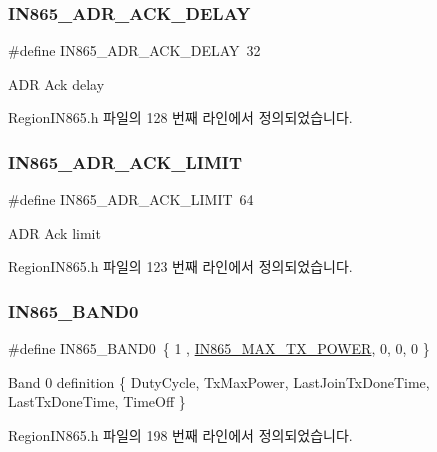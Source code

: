 \subsubsection{\texorpdfstring{I\+N865\+\_\+\+A\+D\+R\+\_\+\+A\+C\+K\+\_\+\+D\+E\+L\+AY}{IN865\_ADR\_ACK\_DELAY}}
{\footnotesize\ttfamily \#define I\+N865\+\_\+\+A\+D\+R\+\_\+\+A\+C\+K\+\_\+\+D\+E\+L\+AY~32}

A\+DR Ack delay 

Region\+I\+N865.\+h 파일의 128 번째 라인에서 정의되었습니다.

\mbox{\label{group___r_e_g_i_o_n_i_n865_ga7ac52736577da9a1671230aad8390229}} 
\subsubsection{\texorpdfstring{I\+N865\+\_\+\+A\+D\+R\+\_\+\+A\+C\+K\+\_\+\+L\+I\+M\+IT}{IN865\_ADR\_ACK\_LIMIT}}
{\footnotesize\ttfamily \#define I\+N865\+\_\+\+A\+D\+R\+\_\+\+A\+C\+K\+\_\+\+L\+I\+M\+IT~64}

A\+DR Ack limit 

Region\+I\+N865.\+h 파일의 123 번째 라인에서 정의되었습니다.

\mbox{\label{group___r_e_g_i_o_n_i_n865_gafe17c0a123d728b699efa637aed2459d}} 
\subsubsection{\texorpdfstring{I\+N865\+\_\+\+B\+A\+N\+D0}{IN865\_BAND0}}
{\footnotesize\ttfamily \#define I\+N865\+\_\+\+B\+A\+N\+D0~\{ 1 , \mbox{\hyperlink{group___r_e_g_i_o_n_i_n865_ga6bd515d7c4fbad47210702da1d9396a3}{I\+N865\+\_\+\+M\+A\+X\+\_\+\+T\+X\+\_\+\+P\+O\+W\+ER}}, 0, 0, 0 \}}

Band 0 definition \{ Duty\+Cycle, Tx\+Max\+Power, Last\+Join\+Tx\+Done\+Time, Last\+Tx\+Done\+Time, Time\+Off \} 

Region\+I\+N865.\+h 파일의 198 번째 라인에서 정의되었습니다.

